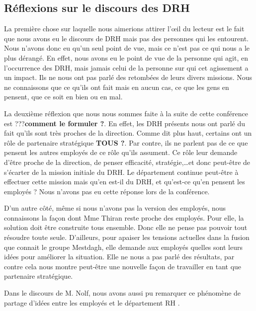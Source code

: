 \subsection{Réflexions sur le discours des DRH}

La première chose sur laquelle nous aimerions attirer l'œil du lecteur est le fait que nous avons eu le discours de DRH mais pas des personnes qui les entourent. Nous n'avons donc eu qu'un seul point de vue, mais ce n'est pas ce qui nous a le plus dérangé. En effet, nous avons eu le point de vue de la personne qui agit, en l'occurrence des DRH, mais jamais celui de la personne sur qui cet agissement a un impact. Ils ne nous ont pas parlé des retombées de leurs divers missions. Nous ne connaissons que ce qu'ils ont fait mais en aucun cas, ce que les gens en pensent, que ce soit en bien ou en mal. \newline 

La deuxième réflexion que nous nous sommes faite à la suite de cette conférence est ???\textbf{comment le formuler ?}. En effet, les DRH présents nous ont parlé du fait qu'ils sont très proches de la direction. Comme dit plus haut, certains ont un rôle de partenaire stratégique \textbf{TOUS ?}. Par contre, ils ne parlent pas de ce que pensent les autres employés de ce rôle qu'ils assument. Ce rôle leur demande d'être proche de la direction, de penser efficacité, stratégie,\ldots et donc peut-être de s'écarter de la mission initiale du DRH.
 Le département continue peut-être à effectuer cette mission mais qu'en est-il du DRH, et qu'est-ce qu'en pensent les employés ? Nous n'avons pas eu cette réponse lors de la conférence. \newline

D'un autre côté, même si nous n'avons pas la version des employés, nous connaissons la façon dont Mme Thiran reste proche des employés. Pour elle, la solution doit être construite tous ensemble. Donc elle ne pense pas pouvoir tout résoudre toute seule. D'ailleurs, pour apaiser les tensions actuelles dans la fusion que connait le groupe Mestdagh, elle demande aux employés quelles sont leurs idées pour améliorer la situation. Elle ne nous a pas parlé des résultats, par contre cela nous montre peut-être une nouvelle façon de travailler en tant que partenaire stratégique.\newline
{} 

Dans le discours de M. Nolf, nous avons aussi pu remarquer ce phénomène de partage d'idées entre les employés et le département RH . \\

